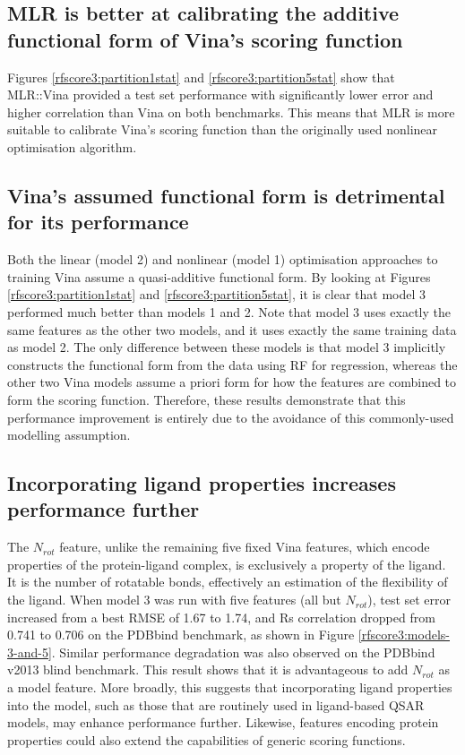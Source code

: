 \subsection{MLR is better at calibrating the additive functional form of Vina's scoring function}

Figures \ref{rfscore3:partition1stat} and \ref{rfscore3:partition5stat} show that MLR::Vina provided a test set performance with significantly lower error and higher correlation than Vina on both benchmarks. This means that MLR is more suitable to calibrate Vina's scoring function than the originally used nonlinear optimisation algorithm.

\subsection{Vina's assumed functional form is detrimental for its performance}

Both the linear (model 2) and nonlinear (model 1) optimisation approaches to training Vina assume a quasi-additive functional form. By looking at Figures \ref{rfscore3:partition1stat} and \ref{rfscore3:partition5stat}, it is clear that model 3 performed much better than models 1 and 2. Note that model 3 uses exactly the same features as the other two models, and it uses exactly the same training data as model 2. The only difference between these models is that model 3 implicitly constructs the functional form from the data using RF for regression, whereas the other two Vina models assume a priori form for how the features are combined to form the scoring function. Therefore, these results demonstrate that this performance improvement is entirely due to the avoidance of this commonly-used modelling assumption.

\subsection{Incorporating ligand properties increases performance further}

The $N_{rot}$ feature, unlike the remaining five fixed Vina features, which encode properties of the protein-ligand complex, is exclusively a property of the ligand. It is the number of rotatable bonds, effectively an estimation of the flexibility of the ligand. When model 3 was run with five features (all but $N_{rot}$), test set error increased from a best RMSE of 1.67 to 1.74, and Rs correlation dropped from 0.741 to 0.706 on the PDBbind benchmark, as shown in Figure \ref{rfscore3:models-3-and-5}. Similar performance degradation was also observed on the PDBbind v2013 blind benchmark. This result shows that it is advantageous to add $N_{rot}$ as a model feature. More broadly, this suggests that incorporating ligand properties into the model, such as those that are routinely used in ligand-based QSAR models, may enhance performance further. Likewise, features encoding protein properties could also extend the capabilities of generic scoring functions.


